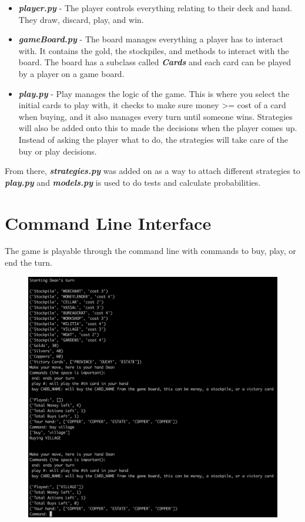 \documentclass[11pt, oneside]{article}   	%
\begin{document}
	\begin{itemize}
  		\item \textbf{\textit{player.py}} - The player controls everything relating to their deck and hand. They draw, discard, play, and win. 
  		\item \textbf{\textit{gameBoard.py}} - The board manages everything a player has to interact with. It contains the gold, the stockpiles, and methods to interact with the board. The board has a subclass called \textbf{\textit{Cards}} and each card can be played by a player on a game board. 
		\item \textbf{\textit{play.py}} - Play manages the logic of the game. This is where you select the initial cards to play with, it checks to make sure money >= cost of a card when buying, and it also manages every turn until someone wins.  Strategies will also be added onto this to made the decisions when the player comes up. Instead of asking the player what to do, the strategies will take care of the buy or play decisions. 
	\end{itemize}
	
From there, \textbf{\textit{strategies.py}} was added on as a way to attach different strategies to \textbf{\textit{play.py}} and \textbf{\textit{models.py}} is used to do tests and calculate probabilities. 

\section{Command Line Interface}

The game is playable through the command line with commands to buy, play, or end the turn. 

\begin{figure}[H]
\hspace*{-1.3in}
\includegraphics[width=1.5\textwidth]{commandLine}
\centering
\end{figure}
\end{document}
